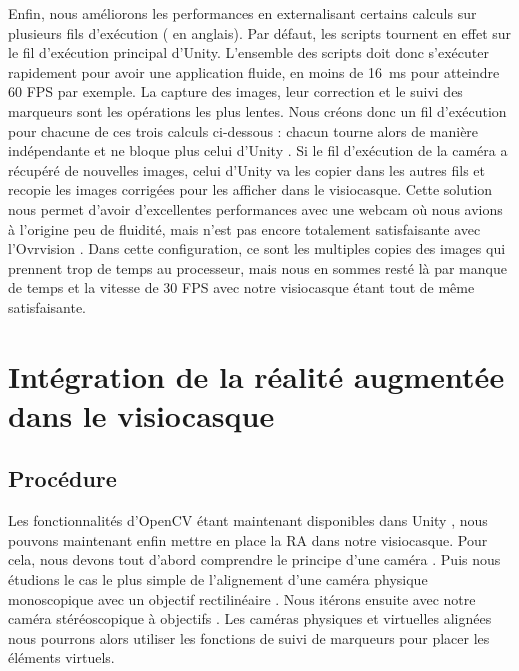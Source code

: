 Enfin, nous améliorons les performances en externalisant certains calculs sur plusieurs fils d'exécution ( en anglais). Par défaut, les scripts tournent en effet sur le fil d'exécution principal d'Unity. L'ensemble des scripts doit donc s'exécuter rapidement pour avoir une application fluide, en moins de \SI{16}{\ms} pour atteindre 60 FPS par exemple. La capture des images, leur correction et le suivi des marqueurs sont les opérations les plus lentes. Nous créons donc un fil d'exécution pour chacune de ces trois calculs ci-dessous : chacun tourne alors de manière indépendante et ne bloque plus celui d'Unity . Si le fil d'exécution de la caméra a récupéré de nouvelles images, celui d'Unity va les copier dans les autres fils et recopie les images corrigées pour les afficher dans le visiocasque. Cette solution nous permet d'avoir d'excellentes performances avec une webcam où nous avions à l'origine peu de fluidité, mais n'est pas encore totalement satisfaisante avec l'Ovrvision . Dans cette configuration, ce sont les multiples copies des images qui prennent trop de temps au processeur, mais nous en sommes resté là par manque de temps et la vitesse de 30 FPS avec notre visiocasque étant tout de même satisfaisante.


\section{Intégration de la réalité augmentée dans le visiocasque}
\label{sec:ar_hmd}

\subsection{Procédure}
\label{subsec:ar_hmd_procedure}

Les fonctionnalités d'OpenCV étant maintenant disponibles dans Unity , nous pouvons maintenant enfin mettre en place la RA dans notre visiocasque. Pour cela, nous devons tout d'abord comprendre le principe d'une caméra . Puis nous étudions le cas le plus simple de l'alignement d'une caméra physique monoscopique avec un objectif rectilinéaire . Nous itérons ensuite avec notre caméra stéréoscopique à objectifs  . Les caméras physiques et virtuelles alignées nous pourrons alors utiliser les fonctions de suivi de marqueurs pour placer les éléments virtuels.


